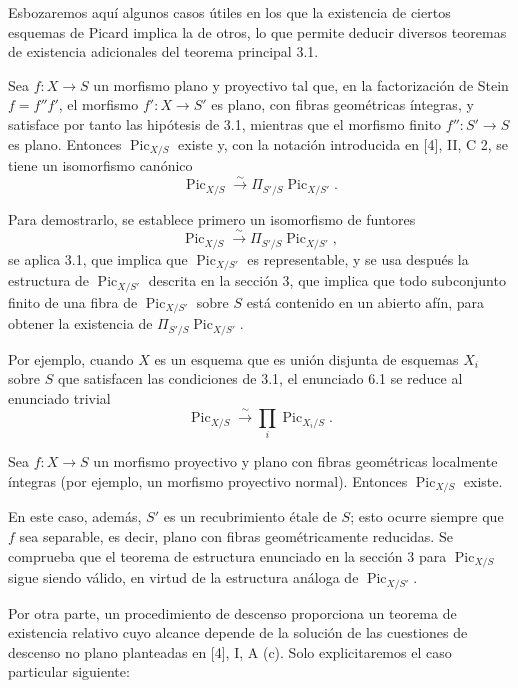 
Esbozaremos aquí algunos casos útiles en los que la existencia de ciertos
esquemas de Picard implica la de otros, lo que permite deducir diversos
teoremas de existencia adicionales del teorema principal 3.1.

 Sea $f:X\longrightarrow S$ un morfismo plano y
proyectivo tal que, en la factorización de Stein $f=f''f'$, el morfismo
$f':X\longrightarrow S'$ es plano, con fibras geométricas íntegras, y satisface
por tanto las hipótesis de 3.1, mientras que el morfismo finito
$f'':S'\longrightarrow S$ es plano. Entonces $\operatorname{Pic}_{X/S}$ existe
y, con la notación introducida en [4], II, C 2, se tiene un isomorfismo canónico
\[
\operatorname{Pic}_{X/S}\xrightarrow{\sim}
\Pi_{S'/S}\operatorname{Pic}_{X/S'}.
\]

Para demostrarlo, se establece primero un isomorfismo de funtores
\[
\operatorname{Pic}_{X/S}\xrightarrow{\sim}
\Pi_{S'/S}\operatorname{Pic}_{X/S'},
\]
se aplica 3.1, que implica que $\operatorname{Pic}_{X/S'}$ es representable, y
se usa después la estructura de $\operatorname{Pic}_{X/S'}$ descrita en la
sección 3, que implica que todo subconjunto finito de una fibra de
$\operatorname{Pic}_{X/S'}$ sobre $S$ está contenido en un abierto afín, para
obtener la existencia de $\Pi_{S'/S}\operatorname{Pic}_{X/S'}$.

Por ejemplo, cuando $X$ es un esquema que es unión disjunta de esquemas $X_i$
sobre $S$ que satisfacen las condiciones de 3.1, el enunciado 6.1 se reduce al
enunciado trivial
\[
\operatorname{Pic}_{X/S}\xrightarrow{\sim}
\prod_i\operatorname{Pic}_{X_i/S}.
\]

 Sea $f:X\longrightarrow S$ un morfismo proyectivo y
plano con fibras geométricas localmente íntegras (por ejemplo, un morfismo
proyectivo normal). Entonces $\operatorname{Pic}_{X/S}$ existe.

En este caso, además, $S'$ es un recubrimiento étale de $S$; esto ocurre
siempre que $f$ sea separable, es decir, plano con fibras geométricamente
reducidas. Se comprueba que el teorema de estructura enunciado en la sección 3
para $\operatorname{Pic}_{X/S}$ sigue siendo válido, en virtud de la estructura
análoga de $\operatorname{Pic}_{X/S'}$.

Por otra parte, un procedimiento de descenso proporciona un teorema de
existencia relativo cuyo alcance depende de la solución de las cuestiones de
descenso no plano planteadas en [4], I, A (c). Solo explicitaremos el caso
particular siguiente:

